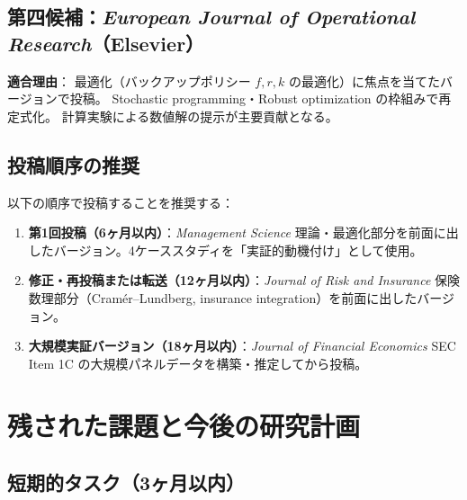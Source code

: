 \documentclass[a4paper,11pt]{article}
\theoremstyle{definition}
\begin{document}
\subsection{第四候補：\textit{European Journal of Operational Research}（Elsevier）}

\begin{tcolorbox}[notebox]
  \textbf{適合理由}：
  最適化（バックアップポリシー $f, r, k$ の最適化）に焦点を当てたバージョンで投稿。
  Stochastic programming・Robust optimization の枠組みで再定式化。
  計算実験による数値解の提示が主要貢献となる。
\end{tcolorbox}

\subsection{投稿順序の推奨}

以下の順序で投稿することを推奨する：

\begin{enumerate}[leftmargin=1.5em, itemsep=4pt]
  \item \textbf{第1回投稿（6ヶ月以内）}：\textit{Management Science}
  理論・最適化部分を前面に出したバージョン。4ケーススタディを「実証的動機付け」として使用。
  \item \textbf{修正・再投稿または転送（12ヶ月以内）}：\textit{Journal of Risk and Insurance}
  保険数理部分（Cramér--Lundberg, insurance integration）を前面に出したバージョン。
  \item \textbf{大規模実証バージョン（18ヶ月以内）}：\textit{Journal of Financial Economics}
  SEC Item 1C の大規模パネルデータを構築・推定してから投稿。
\end{enumerate}

\section{残された課題と今後の研究計画}
\label{sec:roadmap}

\subsection{短期的タスク（3ヶ月以内）}
\end{document}
